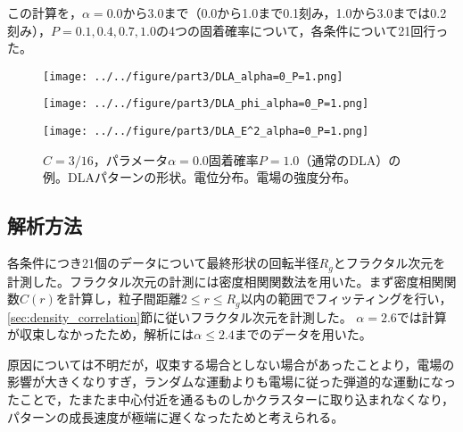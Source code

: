 \documentclass[autodetect-engine,dvi=dvipdfmx,a4paper,ja=standard,oneside,openany,11pt,draft]{bxjsbook}
\begin{document}
この計算を，$\alpha=0.0$から$3.0$まで（0.0から1.0まで0.1刻み，1.0から3.0までは0.2刻み），$P=0.1,0.4,0.7,1.0$の4つの固着確率について，各条件について21回行った。

\begin{figure}[htbp]
  \begin{minipage}{0.32\hsize}
    \subcaption{}
    \centering
    \texttt{[image: ../../figure/part3/DLA\_alpha=0\_P=1.png]}
    \label{fig:DLA_alpha_0_P_1}
  \end{minipage}
  \begin{minipage}{0.32\hsize}
    \subcaption{}
    \centering
    \texttt{[image: ../../figure/part3/DLA\_phi\_alpha=0\_P=1.png]}
    \label{fig:DLA_phi_alpha_0_P_1}
  \end{minipage}
  \begin{minipage}{0.32\hsize}
    \subcaption{}
    \centering
    \texttt{[image: ../../figure/part3/DLA\_E^2\_alpha=0\_P=1.png]}
    \label{fig:DLA_E_alpha_0_P_1}
  \end{minipage}
  \caption{$C=3/16$，パラメータ$\alpha=0.0$固着確率$P=1.0$（通常のDLA）の例。DLAパターンの形状。電位分布。電場の強度分布。}
  \label{fig:DLA_ex}
\end{figure}

\subsection{解析方法}
各条件につき21個のデータについて最終形状の回転半径$R_g$とフラクタル次元を計測した。フラクタル次元の計測には密度相関関数法を用いた。まず密度相関関数$C(r)$を計算し，粒子間距離$2\leq r\leq R_g$以内の範囲でフィッティングを行い，\ref{sec:density_correlation}節に従いフラクタル次元を計測した。
$\alpha=2.6$では計算が収束しなかったため，解析には$\alpha\leq2.4$までのデータを用いた。

原因については不明だが，収束する場合としない場合があったことより，電場の影響が大きくなりすぎ，ランダムな運動よりも電場に従った弾道的な運動になったことで，たまたま中心付近を通るものしかクラスターに取り込まれなくなり，パターンの成長速度が極端に遅くなったためと考えられる。

\ifdraft{
  
  
}{}
\end{document}

